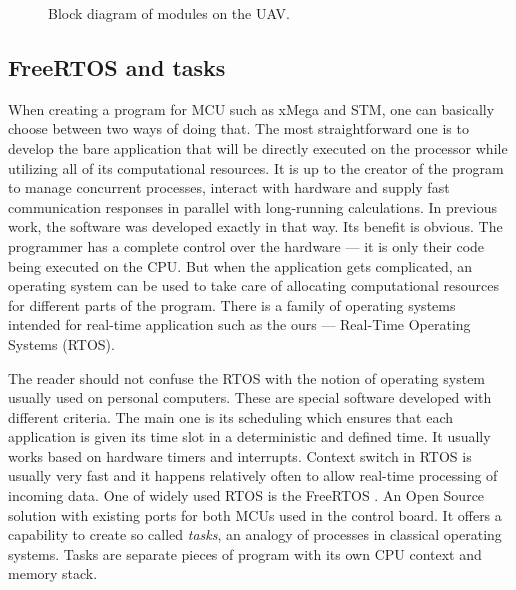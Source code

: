 \begin{figure}[h]
\caption{Block diagram of modules on the UAV.}
\label{fig:block_diagram_uav}
\end{figure}

\subsection{FreeRTOS and tasks}

When creating a program for MCU such as xMega and STM, one can basically choose between two ways of doing that. The most straightforward one is to develop the bare application that will be directly executed on the processor while utilizing all of its computational resources. It is up to the creator of the program to manage concurrent processes, interact with hardware and supply fast communication responses in parallel with long-running calculations. In previous work, the software was developed exactly in that way. Its benefit is obvious. The programmer has a complete control over the hardware --- it is only their code being executed on the CPU. But when the application gets complicated, an operating system can be used to take care of allocating computational resources for different parts of the program. There is a family of operating systems intended for real-time application such as the ours --- Real-Time Operating Systems (RTOS). 

The reader should not confuse the RTOS with the notion of operating system usually used on personal computers. These are special software developed with different criteria. The main one is its scheduling which ensures that each application is given its time slot in a deterministic and defined time. It usually works based on hardware timers and interrupts. Context switch in RTOS is usually very fast and it happens relatively often to allow real-time processing of incoming data. One of widely used RTOS is the FreeRTOS \citep{freertos}. An Open Source solution with existing ports for both MCUs used in the control board. It offers a capability to create so called \textit{tasks}, an analogy of processes in classical operating systems. Tasks are separate pieces of program with its own CPU context and memory stack. 

